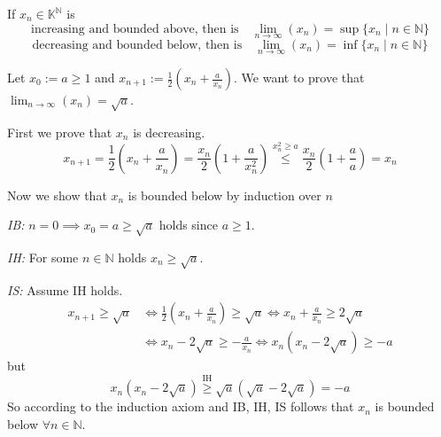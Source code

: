 \begin{theorem}\label{thm:incr_bound_conv}
   If \(x_n \in \mathbb{K}^\mathbb{N}\) is
   \[\text{increasing and bounded above, then is} \quad \lim_{n \to \infty}(x_n) = \sup\{x_n \mid n \in \mathbb{N}\}\]
   \[\text{decreasing and bounded below, then is} \quad \lim_{n \to \infty}(x_n) = \inf\{x_n \mid n \in \mathbb{N}\}\]
\end{theorem}
\begin{example}
   Let \(x_0 := a \geq 1\) and \(x_{n+1} := \frac{1}{2} \left(x_n + \frac{a}{x_n}\right)\).
   We want to prove that \(\lim_{n \to \infty}(x_n) = \sqrt{a}\).

   First we prove that \(x_n\) is decreasing.
   \[x_{n+1} = \frac{1}{2} \left(x_n + \frac{a}{x_n}\right) = \frac{x_n}{2} \left(1 + \frac{a}{x_n^2}\right) \overset{x_n^2 \geq a}{\leq} \frac{x_n}{2} \left(1 + \frac{a}{a}\right) = x_n\]

   Now we show that \(x_n\) is bounded below by induction over \(n\)

   \emph{IB:} \(n = 0 \implies x_0 = a \geq \sqrt{a}\) holds since \(a \geq 1\).

   \emph{IH:} For some \(n \in \mathbb{N}\) holds \(x_n \geq \sqrt{a}\).

   \emph{IS:} Assume IH holds.
   \begin{equation*}
      \begin{split}
         x_{n+1} \geq \sqrt{a} & \iff \frac{1}{2} \left(x_n + \frac{a}{x_n}\right) \geq \sqrt{a} \iff x_n + \frac{a}{x_n} \geq 2 \sqrt{a}\\
                               & \iff x_n - 2\sqrt{a} \geq - \frac{a}{x_n} \iff x_n(x_n - 2\sqrt{a}) \geq -a
      \end{split}
   \end{equation*}
   but
   \[x_n(x_n - 2 \sqrt{a}) \overset{\text{IH}}{\geq} \sqrt{a}(\sqrt{a} - 2 \sqrt{a}) = -a\]
   So according to the induction axiom and IB, IH, IS follows that \(x_n\) is bounded below \(\forall n \in \mathbb{N}\).
\end{example}

